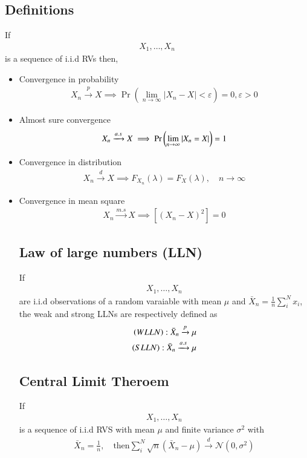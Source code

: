 \documentclass[journal,12pt,twocolumn]{IEEEtran}
\begin{document}
\subsection{Definitions}
If
\begin{align}
X_1, \dots, X_n
\end{align}
is a sequence of i.i.d RVs  then,
\begin{itemize}
\item  Convergence in probability
\begin{align}
X_n\xrightarrow{p}X
\implies \Pr(\lim_{n \to \infty}|X_n-X|< \varepsilon)=0, \varepsilon > 0
\end{align}
\item Almost sure convergence 
\begin{align}
X_n\xrightarrow{a.s}X
\implies \Pr\left(\lim_{n \to \infty}|X_n=X|\right)=1
\end{align}
\item Convergence in distribution 
\begin{align}
X_n\xrightarrow{d}X \implies  F_{X_n} (\lambda)=F_X(\lambda), \quad  n\to \infty
\end{align}
\item Convergence in mean square
\begin{align}
X_n\xrightarrow{m.s}X \implies  [(X_n-X)^2 ]=0
\end{align}

\subsection{Law of large numbers (LLN)}
If
\begin{align}
X_1, \dots, X_n
\end{align}
are i.i.d observations of a random varaiable with mean $\mu$ and $\bar{X}_n = \frac{1}{n} \sum_{i}^{N} x_i $, 
the weak and strong LLNs are respectively defined as
\begin{align}
\left(WLLN\right): \bar{X}_n\xrightarrow{p}\mu
\\
\left(SLLN\right):\bar{X}_n\xrightarrow{a.s}\mu
\end{align}
%
\subsection{Central Limit Theroem}
If
\begin{align}
X_1, \dots, X_n
\end{align}
%
is a sequence of i.i.d RVS with mean $\mu$ and finite variance $\sigma^2$ with
\begin{align}
\bar{X}_n =\frac{1}{n}, \quad \text{then} 
\sum_{i}^{N} \sqrt{n} (\bar{X}_n-\mu )\xrightarrow{d}\mathcal{N}(0,\sigma^2) 
\end{align}
\end{itemize}
\end{document}
